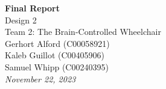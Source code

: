 \documentclass[conference]{IEEEtran}
\begin{document}
\begin{titlepage}
    \begin{center}
        \vspace*{7cm}
        {\fontsize{16}{20}\selectfont \textbf{Final Report}} \\ 
        \vspace{.6cm}
        {\fontsize{16}{20}\selectfont Design 2} \\ 
        \vspace{.6cm}
        {\fontsize{16}{20}\selectfont Team 2: The Brain-Controlled Wheelchair} \\
        \vspace{.6cm}
        {\fontsize{12}{20}\selectfont Gerhort Alford (C00058921)} \\
        \vspace{.6cm}
        {\fontsize{12}{20}\selectfont Kaleb Guillot (C00405906)} \\
        \vspace{.6cm}
        {\fontsize{12}{20}\selectfont Samuel Whipp (C00240395)} \\
        \vspace{.6cm}
        \textit{\fontsize{12}{20}\selectfont November 22, 2023\\}
        \vfill
    \end{center}
\end{titlepage}
\thispagestyle{empty}
\pagestyle{empty}
\onecolumn
\tableofcontents
\twocolumn

\onecolumn
\clearpage
\thispagestyle{plain}
\pagestyle{plain}
\end{document}
